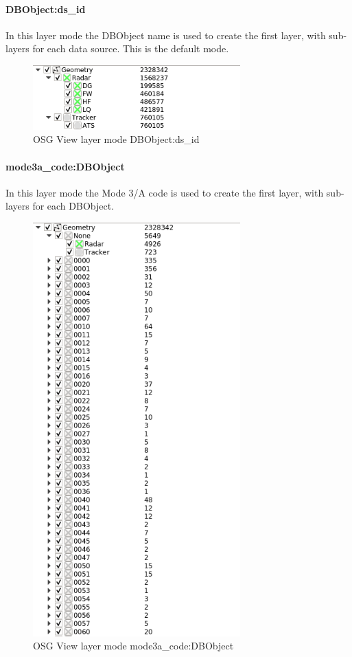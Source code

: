 \paragraph{DBObject:ds\_id}

In this layer mode the DBObject name is used to create the first layer, with sub-layers for each data source. This is the default mode.

\begin{figure}[H]
    \center
    \includegraphics[width=8cm,frame]{../screenshots/osgview_group_dbo_ds.png}
  \caption{OSG View layer mode DBObject:ds\_id}
\end{figure}

\paragraph{mode3a\_code:DBObject}

In this layer mode the Mode 3/A code is used to create the first layer, with sub-layers for each DBObject.

\begin{figure}[H]
\center
    \includegraphics[width=8cm,frame]{../screenshots/osgview_group_ma_dbo.png}
  \caption{OSG View layer mode mode3a\_code:DBObject}
\end{figure}

